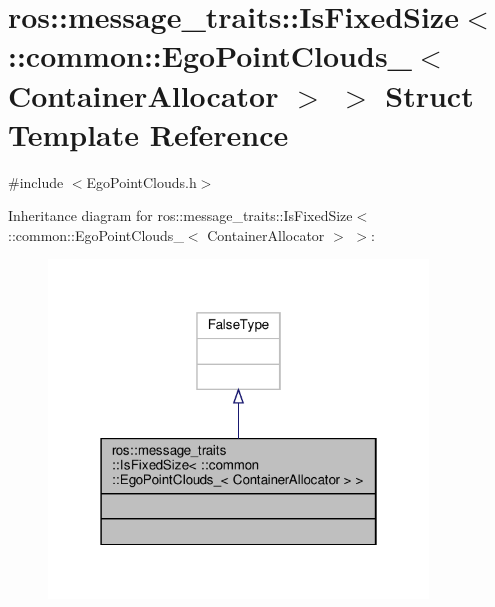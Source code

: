 \hypertarget{structros_1_1message__traits_1_1IsFixedSize_3_01_1_1common_1_1EgoPointClouds___3_01ContainerAllocator_01_4_01_4}{}\section{ros\+:\+:message\+\_\+traits\+:\+:Is\+Fixed\+Size$<$ \+:\+:common\+:\+:Ego\+Point\+Clouds\+\_\+$<$ Container\+Allocator $>$ $>$ Struct Template Reference}
\label{structros_1_1message__traits_1_1IsFixedSize_3_01_1_1common_1_1EgoPointClouds___3_01ContainerAllocator_01_4_01_4}


{\ttfamily \#include $<$Ego\+Point\+Clouds.\+h$>$}



Inheritance diagram for ros\+:\+:message\+\_\+traits\+:\+:Is\+Fixed\+Size$<$ \+:\+:common\+:\+:Ego\+Point\+Clouds\+\_\+$<$ Container\+Allocator $>$ $>$\+:\nopagebreak
\begin{figure}[H]
\begin{center}
\leavevmode
\includegraphics[width=286pt]{df/d05/structros_1_1message__traits_1_1IsFixedSize_3_01_1_1common_1_1EgoPointClouds___3_01ContainerAllocator_01_4_01_4__inherit__graph}
\end{center}
\end{figure}


